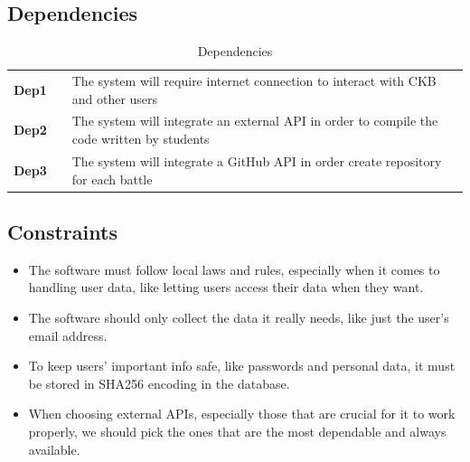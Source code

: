 \subsection{Dependencies}
\begin{table}[H]
    \centering
    \renewcommand{\arraystretch}{1.5}
    \begin{tabular}{l l p{11.5cm}}
        \hline
        \textbf{Dep1} &  & The system will require internet connection to interact with CKB and other users           \\
        \textbf{Dep2} &  & The system will integrate an external API in order to compile the code written by students \\
        \textbf{Dep3} &  & The system will integrate a GitHub API in order create repository for each battle          \\
        \hline
    \end{tabular}
    \caption{Dependencies}
\end{table}

\subsection{Constraints}
\begin{itemize}
    \item The software must follow local laws and rules, especially when it comes to handling user data, like letting users access their data when they want.
    \item The software should only collect the data it really needs, like just the user's email address.
    \item To keep users' important info safe, like passwords and personal data, it must be stored in SHA256 encoding in the database.
    \item When choosing external APIs, especially those that are crucial for it to work properly, we should pick the ones that are the most dependable and always available.
\end{itemize}